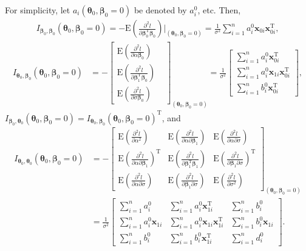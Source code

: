 \documentclass[10pt,a4paper]{article}
\def\bbeta{\bm{\beta}}
\def\bxoi{\mathbf{x}_{0i}}
\def\bxni{\mathbf{x}_{1i}}
\def\E{\text{E}}
\begin{document}
For simplicity, let $a_i(\boldsymbol\theta_0, \bbeta_0 = 0)$ be denoted by $a_i^0$, etc. Then,
\begin{align*}
I_{\bbeta_0, \bbeta_0}(\boldsymbol\theta_0, \bbeta_0 = 0) = - \E\left( \frac{\partial^2 l}{\partial \bbeta_0^{\text{T}} \bbeta_0} \right)\bigg|_{(\boldsymbol\theta_0, \bbeta_0 = 0)} = \frac{1}{\sigma^2}\sum_{i=1}^n a_i^0 \bxoi \bxoi^{\text{T}},
\end{align*}
\begin{align*}
I_{\boldsymbol\theta_0, \bbeta_0}(\boldsymbol\theta_0, \bbeta_0 = 0) &= - \begin{bmatrix}
\E\left( \frac{\partial^2 l}{\partial \alpha \bbeta_0}\right) \\ \E\left( \frac{\partial^2 l}{\partial \bbeta_1^{\text{T}} \bbeta_0} \right) &\\ \E\left( \frac{\partial^2 l}{\partial \sigma \bbeta_0}\right)
\end{bmatrix}_{(\boldsymbol\theta_0, \bbeta_0 = 0)}
= \frac{1}{\sigma^2} \begin{bmatrix}
\sum_{i=1}^n a_i^0 \bxoi^{\text{T}} \\ \sum_{i=1}^n a_i^0 \bxni \bxoi^{\text{T}} \\ \sum_{i=1}^n b_i^0\bxoi^{\text{T}}
\end{bmatrix},
\end{align*}
$I_{\bbeta_0, \boldsymbol\theta_0}(\boldsymbol\theta_0, \bbeta_0 = 0) = I_{\boldsymbol\theta_0,\bbeta_0}(\boldsymbol\theta_0, \bbeta_0 = 0)^{\text{T}}$, and
\begin{align*}
I_{\boldsymbol\theta_0, \boldsymbol\theta_0}(\boldsymbol\theta_0, \bbeta_0 = 0) &= -
\begin{bmatrix}
\E\left(\frac{\partial^2 l}{\partial \alpha^2}\right)  & \E\left(\frac{\partial^2 l}{\partial \alpha \partial \bbeta_1}\right) & \E\left(\frac{\partial^2 l}{\partial \alpha \partial \sigma}\right) \\
\E\left(\frac{\partial^2 l}{\partial \alpha \partial \bbeta_1}\right)^{\text{T}} & \E\left(\frac{\partial^2 l}{\partial \bbeta_1^{\text{T}} \bbeta_1}\right) & \E\left(\frac{\partial^2 l}{\partial \bbeta_1 \partial \sigma}\right)^{\text{T}} \\
\E\left(\frac{\partial^2 l}{\partial \alpha \partial \sigma}\right) & \E\left(\frac{\partial^2 l}{\partial \bbeta_1 \partial \sigma}\right) & \E\left(\frac{\partial^2 l}{\partial \sigma^2}\right)
\end{bmatrix}_{(\boldsymbol\theta_0, \bbeta_0 = 0)} \\
&= \frac{1}{\sigma^2} \begin{bmatrix}
\sum_{i=1}^n a_i^0 & \sum_{i=1}^n a_i^0 \bxni^{\text{T}} & \sum_{i=1}^n b_i^0 \\
\sum_{i=1}^n a_i^0 \bxni & \sum_{i=1}^n a_i^0 \bxni \bxni^{\text{T}} & \sum_{i=1}^n b_i^0\bxni \\
\sum_{i=1}^n b_i^0 & \sum_{i=1}^n b_i^0 \bxni^{\text{T}} & \sum_{i=1}^n d_i^0
\end{bmatrix}.
\end{align*}
\end{document}
